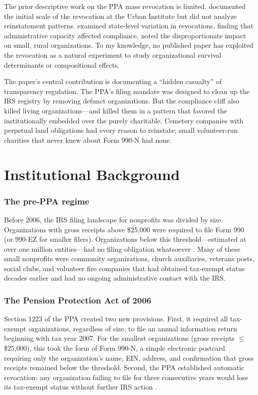 \documentclass[12pt]{article}
\begin{document}
The prior descriptive work on the PPA mass revocation is limited. \citet{blackwoodroeger2011} documented the initial scale of the revocation at the Urban Institute but did not analyze reinstatement patterns. \citet{oehri2019} examined state-level variation in revocations, finding that administrative capacity affected compliance. \citet{gronskyetal2012} noted the disproportionate impact on small, rural organizations. To my knowledge, no published paper has exploited the revocation as a natural experiment to study organizational survival determinants or compositional effects.

The paper's central contribution is documenting a ``hidden casualty'' of transparency regulation. The PPA's filing mandate was designed to clean up the IRS registry by removing defunct organizations. But the compliance cliff also killed living organizations---and killed them in a pattern that favored the institutionally embedded over the purely charitable. Cemetery companies with perpetual land obligations had every reason to reinstate; small volunteer-run charities that never knew about Form 990-N had none.

\section{Institutional Background}

\subsubsection*{The pre-PPA regime} Before 2006, the IRS filing landscape for nonprofits was divided by size. Organizations with gross receipts above \$25,000 were required to file Form 990 (or 990-EZ for smaller filers). Organizations below this threshold---estimated at over one million entities---had no filing obligation whatsoever \citep{irsstats2006}. Many of these small nonprofits were community organizations, church auxiliaries, veterans posts, social clubs, and volunteer fire companies that had obtained tax-exempt status decades earlier and had no ongoing administrative contact with the IRS.

\subsubsection*{The Pension Protection Act of 2006} Section 1223 of the PPA created two new provisions. First, it required all tax-exempt organizations, regardless of size, to file an annual information return beginning with tax year 2007. For the smallest organizations (gross receipts $\leq$ \$25,000), this took the form of Form 990-N, a simple electronic postcard requiring only the organization's name, EIN, address, and confirmation that gross receipts remained below the threshold. Second, the PPA established automatic revocation: any organization failing to file for three consecutive years would lose its tax-exempt status without further IRS action \citep{ppa2006}.
\end{document}
